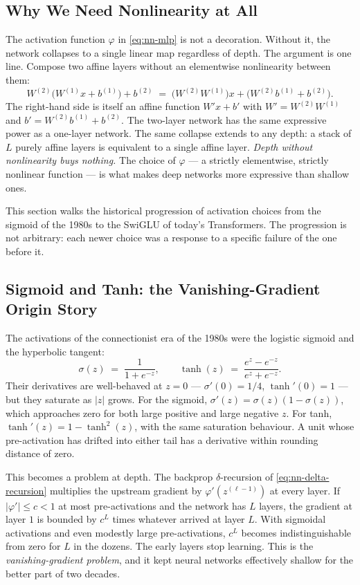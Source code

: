 \subsection{Why We Need Nonlinearity at All}

The activation function $\varphi$ in \eqref{eq:nn-mlp} is not a
decoration. Without it, the network collapses to a single linear
map regardless of depth. The argument is one line. Compose two
affine layers without an elementwise nonlinearity between them:
\[
  W^{(2)}\bigl(W^{(1)} x + b^{(1)}\bigr) + b^{(2)}
  \;=\; \bigl(W^{(2)} W^{(1)}\bigr) x
       + \bigl(W^{(2)} b^{(1)} + b^{(2)}\bigr).
\]
The right-hand side is itself an affine function $W' x + b'$ with
$W' = W^{(2)} W^{(1)}$ and $b' = W^{(2)} b^{(1)} + b^{(2)}$. The
two-layer network has the same expressive power as a one-layer
network. The same collapse extends to any depth: a stack of $L$
purely affine layers is equivalent to a single affine layer.
\emph{Depth without nonlinearity buys nothing.} The choice of
$\varphi$ --- a strictly elementwise, strictly nonlinear function ---
is what makes deep networks more expressive than shallow ones.

This section walks the historical progression of activation
choices from the sigmoid of the 1980s to the SwiGLU of today's
Transformers. The progression is not arbitrary: each newer choice
was a response to a specific failure of the one before it.

\subsection{Sigmoid and Tanh: the Vanishing-Gradient Origin Story}

The activations of the connectionist era of the 1980s were the
logistic sigmoid and the hyperbolic tangent:
\[
  \sigma(z) \;=\; \frac{1}{1 + e^{-z}},
  \qquad
  \tanh(z) \;=\; \frac{e^{z} - e^{-z}}{e^{z} + e^{-z}}.
\]
Their derivatives are well-behaved at $z = 0$ ---
$\sigma'(0) = 1/4$, $\tanh'(0) = 1$ --- but they saturate as
$|z|$ grows. For the sigmoid, $\sigma'(z) = \sigma(z)(1 - \sigma(z))$,
which approaches zero for both large positive and large negative
$z$. For tanh, $\tanh'(z) = 1 - \tanh^2(z)$, with the same
saturation behaviour. A unit whose pre-activation has drifted
into either tail has a derivative within rounding distance of
zero.

This becomes a problem at depth. The backprop $\delta$-recursion
of \eqref{eq:nn-delta-recursion} multiplies the upstream gradient
by $\varphi'(z^{(\ell-1)})$ at every layer. If $|\varphi'| \le c < 1$
at most pre-activations and the network has $L$ layers, the
gradient at layer $1$ is bounded by $c^{L}$ times whatever
arrived at layer $L$. With sigmoidal activations and even
modestly large pre-activations, $c^{L}$ becomes
indistinguishable from zero for $L$ in the dozens. The early
layers stop learning. This is the \emph{vanishing-gradient
problem}, and it kept neural networks effectively shallow for
the better part of two decades.

